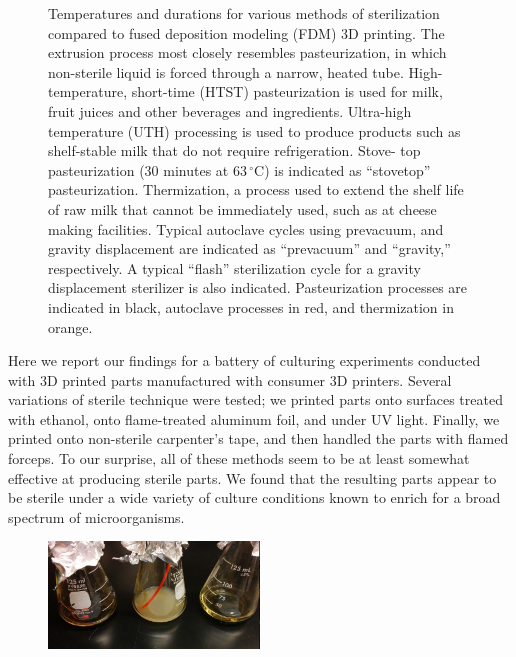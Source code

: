\begin{refsection}
\begin{figure}
    \caption{Temperatures and durations for various methods of
      sterilization compared to fused deposition modeling (FDM) 3D
      printing. The extrusion process most closely resembles
      pasteurization, in which non-sterile liquid is forced through a
      narrow, heated tube. High- temperature, short-time (HTST)
      pasteurization is used for milk, fruit juices and other
      beverages and ingredients. Ultra-high temperature (UTH)
      processing is used to produce products such as shelf-stable milk
      that do not require refrigeration. Stove- top pasteurization (30
      minutes at 63$\,^{\circ}\mathrm{C}$) is indicated as
      ``stovetop'' pasteurization. Thermization, a process used to
      extend the shelf life of raw milk that cannot be immediately
      used, such as at cheese making facilities. Typical autoclave
      cycles using prevacuum, and gravity displacement are indicated
      as ``prevacuum'' and ``gravity,'' respectively. A typical
      ``flash'' sterilization cycle for a gravity displacement
      sterilizer is also indicated. Pasteurization processes are
      indicated in black, autoclave processes in red, and thermization
      in orange.}

\label{fig:pasteurization}
\end{figure}

Here we report our findings for a battery of culturing experiments
conducted with 3D printed parts manufactured with consumer 3D
printers. Several variations of sterile technique were tested; we
printed parts onto surfaces treated with ethanol, onto flame-treated
aluminum foil, and under UV light.  Finally, we printed onto
non-sterile carpenter's tape, and then handled the parts with flamed
forceps. To our surprise, all of these methods seem to be at least
somewhat effective at producing sterile parts. We found that the
resulting parts appear to be sterile under a wide variety of culture
conditions known to enrich for a broad spectrum of microorganisms.

\begin{figure}
  \centering
    \includegraphics[width=0.5\textwidth]{sterility/figures/Fig2}


\end{figure}
\end{refsection}
